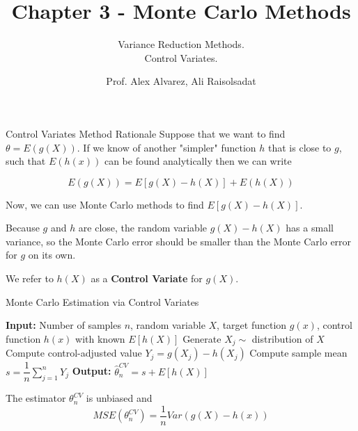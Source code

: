 \documentclass[8pt]{beamer}
\title{Chapter 3 - Monte Carlo Methods}
\subtitle{Variance Reduction Methods.\\ Control Variates.}
\author{Prof. Alex Alvarez, Ali Raisolsadat}
\institute{School of Mathematical and Computational Sciences \\ University of Prince Edward Island}
\date{} %
\begin{document}
\maketitle

\begin{frame}{Control Variates Method Rationale}
Suppose that we want to find $\theta=E(g(X))$. If we know of another "simpler" function $h$ that is close to $g$, such that $E(h(x))$ can be found analytically then we can write

$$E\left(g(X)\right)=E\left[g(X)-h(X)\right]+E\left(h(X)\right)$$

Now, we can use Monte Carlo methods to find $E\left[g(X)-h(X)\right]$. 
\vspace{2mm}

Because $g$ and $h$ are close, the random variable $g(X)-h(X)$ has a small variance, so the Monte Carlo error should be smaller than the Monte Carlo error for $g$ on its own.
\vspace{2mm}

We refer to $h(X)$ as a \textbf{Control Variate} for $g(X)$.
\end{frame}

\begin{frame}{Monte Carlo Estimation via Control Variates}
\begin{algorithm}[H]
\caption{Monte Carlo Estimation via Control Variates}\label{alg:control-variates}
\begin{algorithmic}[1]
  \State \textbf{Input:} Number of samples $n$, random variable $X$, target function $g(x)$, control function $h(x)$ with known $E[h(X)]$
    \State Generate $X_j \sim$ distribution of $X$
    \State Compute control-adjusted value $Y_j = g(X_j) - h(X_j)$
  \EndFor
  \State Compute sample mean $s = \dfrac{1}{n} \sum_{j=1}^n Y_j$
  \State \textbf{Output:} $\displaystyle \hat{\theta}_n^{CV} = s + E[h(X)]$
\end{algorithmic}
\end{algorithm}
The estimator $\theta_n^{CV}$ is unbiased and 
$$MSE(\theta_n^{CV})=\frac{1}{n}Var(g(X)-h(x))$$
\end{frame}
\end{document}
